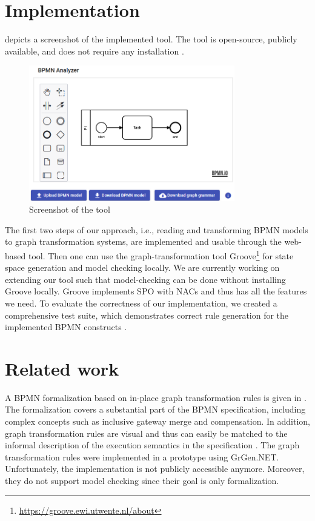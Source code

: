 \documentclass[submission, copyright, creativecommons]{eptcs}
\begin{document}
\section{Implementation} \label{sec:impl}
 depicts a screenshot of the implemented tool.
The tool is open-source, publicly available, and does not require any installation \cite{timkrauterArtifactsTERMGRAPH2022}.

\begin{figure}[h]
    \centering
    \includegraphics[width=0.8\textwidth]{images/impl.png}
    \caption{Screenshot of the tool}
    \label{fig:implScreenshot}
\end{figure}

The first two steps of our approach, i.e., reading and transforming BPMN models to graph transformation systems, are implemented and usable through the web-based tool.
Then one can use the graph-transformation tool Groove\footnote{\url{https://groove.ewi.utwente.nl/about}} for state space generation and model checking locally.
We are currently working on extending our tool such that model-checking can be done without installing Groove locally.
Groove implements SPO with NACs and thus has all the features we need.
To evaluate the correctness of our implementation, we created a comprehensive test suite, which demonstrates correct rule generation for the implemented BPMN constructs \cite{timkrauterArtifactsTERMGRAPH2022}.

\section{Related work} \label{sec:relatedWork}
A BPMN formalization based on in-place graph transformation rules is given in \cite{vangorpVisualTokenbasedFormalization2013}.
The formalization covers a substantial part of the BPMN specification, including complex concepts such as inclusive gateway merge and compensation.
In addition, graph transformation rules are visual and thus can easily be matched to the informal description of the execution semantics in the specification \cite{objectmanagementgroupBusinessProcessModel2013}.
The graph transformation rules were implemented in a prototype using GrGen.NET.
Unfortunately, the implementation is not publicly accessible anymore.
Moreover, they do not support model checking since their goal is only formalization.
\end{document}
